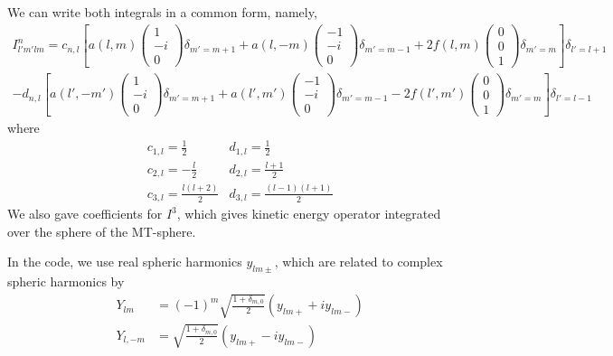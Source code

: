 \documentclass[aps,prb,floatfix,epsfig,singlecolumn,showpacs,preprintnumbers]{revtex4}
\begin{document}
We can write both integrals in a common form, namely,
\begin{eqnarray}
I^n_{l'm'lm}=c_{n,l}
\left[
a(l,m)
\left(
\begin{array}{c}
1\\
-i\\
0
\end{array}
\right)
\delta_{m'=m+1}
+a(l,-m)
\left(
\begin{array}{c}
-1\\
-i\\
0
\end{array}
\right)
\delta_{m'=m-1}
+2 f(l,m)
\left(
\begin{array}{c}
0\\
0\\
1
\end{array}
\right)
\delta_{m'=m}
\right]\delta_{l'=l+1}
\\
-d_{n,l}
\left[
a(l',-m')
\left(
\begin{array}{c}
1\\
-i\\
0
\end{array}
\right)
\delta_{m'=m+1}
+a(l',m')
\left(
\begin{array}{c}
-1\\
-i\\
0
\end{array}
\right)
\delta_{m'=m-1}
-2 f(l',m')
\left(
\begin{array}{c}
0\\
0\\
1
\end{array}
\right)
\delta_{m'=m}
\right]\delta_{l'=l-1}
\end{eqnarray}
where 
\begin{eqnarray}
& c_{1,l} = \frac{1}{2}      & d_{1,l}=\frac{1}{2}\\
& c_{2,l}=-\frac{l}{2}       & d_{2,l}=\frac{l+1}{2}\\
& c_{3,l}=\frac{l(l+2)}{2} & d_{3,l}=\frac{(l-1)(l+1)}{2}
\end{eqnarray}
We also gave coefficients for $I^3$, which gives kinetic energy operator
integrated over the sphere of the MT-sphere.

In the code, we use real spheric harmonics $y_{lm\pm}$, which are related
to complex spheric harmonics by
\begin{eqnarray}
&Y_{lm}&=(-1)^m \sqrt{\frac{1+\delta_{m,0}}{2}}(y_{lm+}+i y_{lm-})\\
&Y_{l,-m}&=\sqrt{\frac{1+\delta_{m,0}}{2}}(y_{lm+}-i y_{lm-})
\end{eqnarray}
\end{document}
